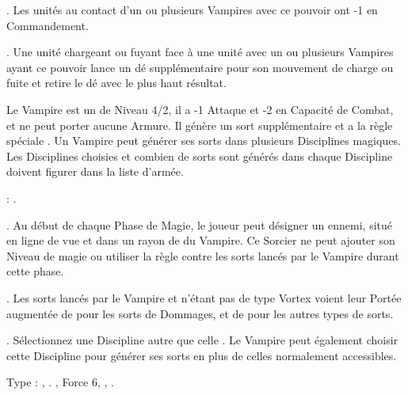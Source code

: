 { \textbf{\bloodlinepower}. Les unités au contact d'un ou plusieurs Vampires avec ce pouvoir ont -1 en Commandement.

 \textbf{\bloodlinepower}. Une unité chargeant ou fuyant face à une unité avec un ou plusieurs Vampires ayant ce pouvoir lance un dé supplémentaire pour son mouvement de charge ou fuite et retire le dé avec le plus haut résultat.

\endpricelist


\noindent\parbox{\columnwidth}{
Le Vampire est un \wizard{} de Niveau 4/2, il a -1 Attaque et -2 en Capacité de Combat, et ne peut porter aucune Armure. Il génère un sort supplémentaire et a la règle spéciale \awaken{\zombies, \skeletons}. Un Vampire \nosferatu{} peut générer ses sorts dans plusieurs Disciplines magiques. Les Disciplines choisies et combien de sorts sont générés dans chaque Discipline doivent figurer dans la liste d'armée.

\bloodties{}: \wraiths{}.
}

\startpricelist

 \textbf{\ancientbloodpower}. Au début de chaque Phase de Magie, le joueur peut désigner un \wizard{} ennemi, situé en ligne de vue et dans un rayon de  du Vampire. Ce Sorcier ne peut ajouter son Niveau de magie ou utiliser la règle \removedrule{\aideddispel{}} contre les sorts lancés par le Vampire durant cette phase. 

 \textbf{\bloodlinepower}. Les sorts lancés par le Vampire et n'étant pas de type Vortex voient leur Portée augmentée de  pour les sorts de Dommages, et de  pour les autres types de sorts.

 \textbf{\bloodlinepower}. Sélectionnez une Discipline \battle{} autre que celle \nature{}. Le Vampire peut également choisir cette Discipline pour générer ses sorts en plus de celles normalement accessibles.

\endpricelist


\closearmynewsection

\startarmymagicalitems

\armymagicalweapons

\startpricelist

 Type : \artilleryweapon{}, \boltthrower{}. , Force 6, , .

}
